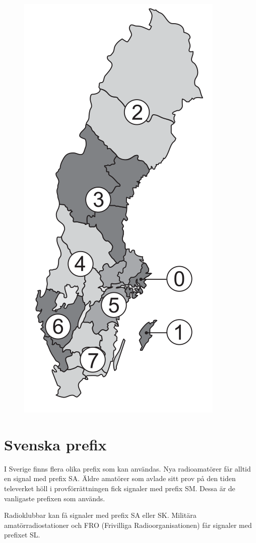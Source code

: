 \begin{figure}
  \centering
  \includegraphics[width=.7\columnwidth]{blabok/pictures/R5-1.png}
\end{figure}

\section{Svenska prefix}

I Sverige finns flera olika prefix som kan användas. Nya radioamatörer
får alltid en signal med prefix SA. Äldre amatörer som avlade sitt
prov på den tiden televerket höll i provförrättningen fick signaler
med prefix SM. Dessa är de vanligaste prefixen som används.

Radioklubbar kan få signaler med prefix SA eller SK. Militära
amatörradiostationer och FRO (Frivilliga Radioorganisationen) får
signaler med prefixet SL.

